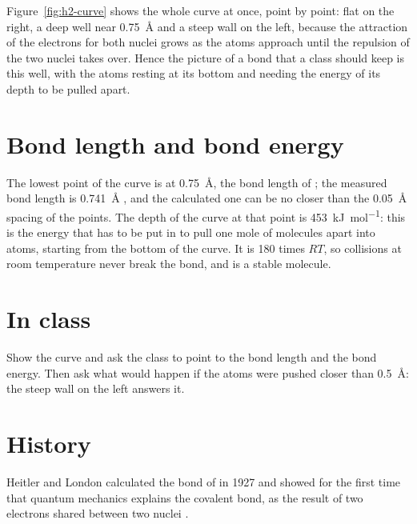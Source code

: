 Figure~\ref{fig:h2-curve} shows the whole curve at once, point by point: flat on the right, a deep well near \SI{0.75}{\angstrom} and a steep wall on the left, because the attraction of the electrons for both nuclei grows as the atoms approach until the repulsion of the two nuclei takes over. Hence the picture of a bond that a class should keep is this well, with the atoms resting at its bottom and needing the energy of its depth to be pulled apart.

\section{Bond length and bond energy}
The lowest point of the curve is at \SI{0.75}{\angstrom}, the bond length of ; the measured bond length is \SI{0.741}{\angstrom} \cite{nistwebbook}, and the calculated one can be no closer than the \SI{0.05}{\angstrom} spacing of the points. The depth of the curve at that point is \SI{453}{kJ.mol^{-1}}: this is the energy that has to be put in to pull one mole of  molecules apart into atoms, starting from the bottom of the curve. It is 180 times $RT$, so collisions at room temperature never break the bond, and  is a stable molecule.

\section{In class}
Show the curve and ask the class to point to the bond length and the bond energy. Then ask what would happen if the atoms were pushed closer than \SI{0.5}{\angstrom}: the steep wall on the left answers it.

\section{History}
Heitler and London calculated the bond of  in 1927 and showed for the first time that quantum mechanics explains the covalent bond, as the result of two electrons shared between two nuclei \cite{heitler1927}.
